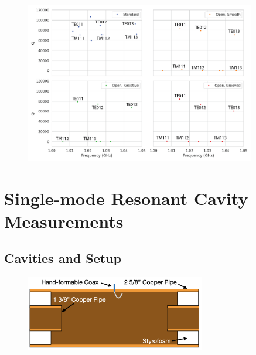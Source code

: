 \begin{figure}[htbp]
    \centering
    \includegraphics*[width=0.9\textwidth]{figs/Chapter-6/230610_cavity_variation_eigenmodes_linear_annotate.png}
    \caption{}
\end{figure}

\section{Single-mode Resonant Cavity Measurements}
\label{sec:chap6-single-mode-cavity-measurement}

\subsection{Cavities and Setup}

\begin{figure}[htbp]
    \centering
    \includegraphics*[width=0.7\textwidth]{figs/Chapter-6/230612_toy_cavity_cartoon.png}
    \caption{}
\end{figure}


